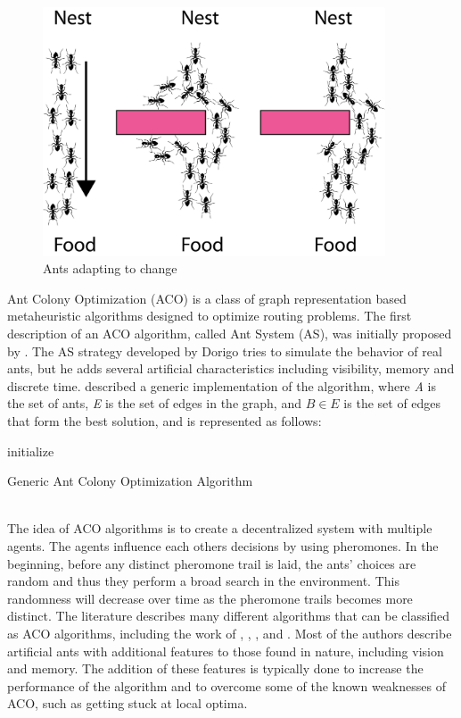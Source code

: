 \begin{figure}[H]
  \centering
  \includegraphics[width=4in]{assets/maur.png}
  \caption{Ants adapting to change}
   \label{fig:ants}
\end{figure}

Ant Colony Optimization (ACO) is a class of graph representation based metaheuristic algorithms designed to optimize routing problems. The first description of an ACO algorithm, called Ant System (AS), was initially proposed by \citet{dorigo96}. The AS strategy developed by Dorigo tries to simulate the behavior of real ants, but he adds several artificial characteristics including visibility, memory and discrete time. \citet{nanda11} described a generic implementation of the algorithm, where \textit{A} is the set of ants, \textit{E} is the set of edges in the graph, and $B \in E$ is the set of edges that form the best solution, and is represented as follows: \\

\begin{algorithm}[H]
 initialize\;
 \caption{Generic Ant Colony Optimization Algorithm}
\end{algorithm}
~\\
The idea of ACO algorithms is to create a decentralized system with multiple agents. The agents influence each others decisions by using pheromones. In the beginning, before any distinct pheromone trail is laid, the ants' choices are random and thus they perform a broad search in the environment. This randomness will decrease over time as the pheromone trails becomes more distinct. The literature describes many different algorithms that can be classified as ACO algorithms, including the work of \citet{salehi-nezhad07}, \citet{tripathi09}, \citet{jiang10}, and \citet{dias14}. Most of the authors describe artificial ants with additional features to those found in nature, including vision and memory. The addition of these features is typically done to increase the performance of the algorithm and to overcome some of the known weaknesses of ACO, such as getting stuck at local optima.  

